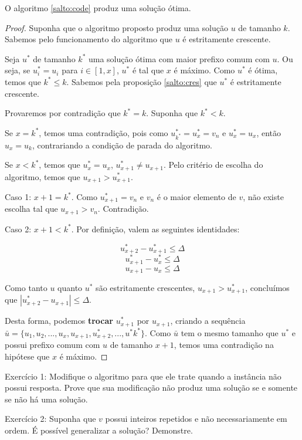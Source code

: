 \begin{theo} \label{salto:proof}
O algoritmo \ref{salto:code} produz uma solução ótima.
\end{theo}
\begin{proof}

Suponha que o algoritmo proposto produz uma solução $u$ de tamanho $k$. Sabemos pelo funcionamento do algoritmo que $u$ é estritamente crescente.

Seja $u^*$ de tamanho $k^*$ uma solução ótima com maior prefixo comum com $u$. Ou seja, se $u^*_i = u_i$ para $i \in [1, x]$, $u^*$ é tal que $x$ é máximo. Como $u^*$ é ótima, temos que $k^* \leq k$. Sabemos pela proposição \ref{salto:cres} que $u^*$ é estritamente crescente.

Provaremos por contradição que $k^* = k$.  Suponha que $k^* < k$.

Se $x = k^*$, temos uma contradição, pois como $u^*_{k^*} = u^*_x = v_n$ e $u^*_x = u_x$, então $u_x = u_k$, contrariando a condição de parada do algoritmo. 

Se $x < k^*$, temos que $u^*_{x} = u_{x}$, $u^*_{x + 1} \neq u_{x + 1}$. Pelo critério de escolha do algoritmo, temos que $u_{x + 1} > u^*_{x + 1}$.

Caso 1: $x + 1 = k^*$. Como $u^*_{x + 1} = v_n$ e $v_n$ é o maior elemento de $v$, não existe escolha tal que $u_{x + 1} > v_n$. Contradição.

Caso 2: $x + 1 < k^*$. Por definição, valem as seguintes identidades:

$$u^*_{x + 2} - u^*_{x + 1} \leq \Delta$$
$$u^*_{x + 1} - u^*_{x} \leq \Delta$$
$$u_{x + 1} - u_{x} \leq \Delta$$

Como tanto $u$ quanto $u^*$ são estritamente crescentes, $u_{x + 1} > u^*_{x + 1}$, concluímos que $|u^*_{x + 2} - u_{x + 1}| \leq \Delta$.

Desta forma, podemos \textbf{trocar} $u^*_{x + 1}$ por $u_{x + 1}$, criando a sequência $\bar{u} = \{u_1, u_2, ..., u_x, u_{x + 1}, u^*_{x + 2}, ..., u^*{k^*}\}$. Como $\bar{u}$ tem o mesmo tamanho que $u^*$ e possui prefixo comum com $u$ de tamanho $x + 1$, temos uma contradição na hipótese que $x$ é máximo.

\end{proof}

Exercício 1: Modifique o algoritmo para que ele trate quando a instância não possui resposta. Prove que sua modificação não produz uma solução se e somente se não há uma solução.

Exercício 2: Suponha que $v$ possui inteiros repetidos e não necessariamente em ordem. É possível generalizar a solução? Demonstre.

